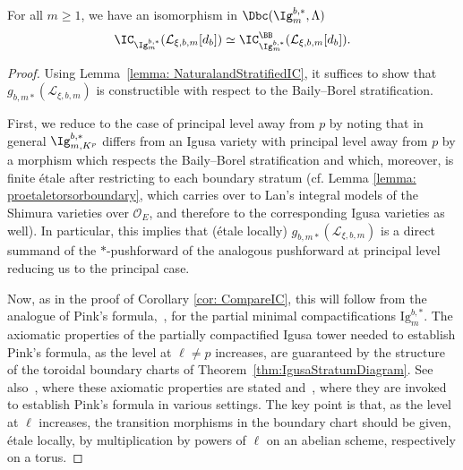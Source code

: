 \documentclass[letterpaper,11pt]{amsart}
\begin{document}
\begin{proposition}{\label{prop: TwoDefinitionsofIntCohonperfectIgusavarieties}}
For all $m \geq 1$, we have an isomorphism in $\Dbc(\Ig^{b,*}_m,\Lambda)$
\[ \IC_{\Ig^{b,*}_{m}}(\mathcal{L}_{\xi,b,m}[d_{b}]) \simeq \IC_{\Ig^{b,*}_{m}}^{\BB}(\mathcal{L}_{\xi,b,m}[d_{b}]).\]
\end{proposition}
\begin{proof}
Using Lemma~\ref{lemma: NaturalandStratifiedIC}, it suffices to show that $g_{b,m*}(\mathcal{L}_{\xi,b,m})$ is constructible with respect to the Baily--Borel stratification. 

First, we reduce to the case of principal level away from $p$ by noting that in general $\Ig^{b,*}_{m,K^{p}}$ differs from an Igusa variety with principal level away from $p$ by a morphism which respects the Baily--Borel stratification and which, moreover, is finite \'etale after restricting to each boundary stratum (cf. Lemma \ref{lemma: proetaletorsorboundary}, which carries over to Lan's integral models of the Shimura varieties over $\mathcal{O}_E$, and therefore to the corresponding Igusa varieties as well). In particular, this implies that (\'etale locally) $g_{b,m*}(\mathcal{L}_{\xi,b,m})$ is a direct summand of the $*$-pushforward of the analogous pushforward at principal level reducing us to the principal case. 

Now, as in the proof of Corollary \ref{cor: CompareIC}, this will follow from the analogue of Pink's formula,~\cite[Theorem 4.2.1]{PinkHigherDirectImages}, for the partial minimal compactifications $\mathrm{Ig}^{b,*}_m$. The axiomatic properties of the partially compactified Igusa tower needed to establish Pink's formula, as the level at $\ell\not =p$ increases, are guaranteed by the structure of the toroidal boundary charts of Theorem~\ref{thm:IgusaStratumDiagram}. See also~\cite[Lemma 4.3.2]{LanStroh}, where these axiomatic properties are stated and~\cite[Theorem 4.3.10]{LanStroh}, where they are invoked to establish Pink's formula in various settings. The key point is that, as the level at $\ell$ increases, the transition morphisms in the boundary chart should be given, \'etale locally, by multiplication by powers of $\ell$ on an abelian scheme, respectively on a torus. 
\end{proof}
\end{document}
